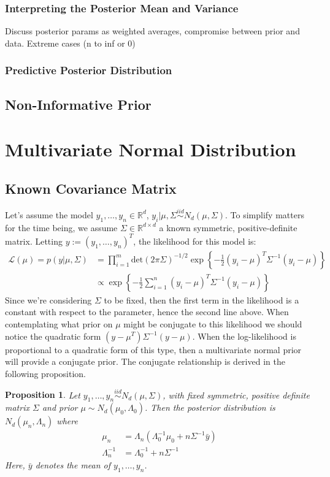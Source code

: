 \documentclass[12pt]{article}
\newcommand{\R}{\mathcal{R}}
\def\R{\mathbb{R}}
\newtheorem{prop}{Proposition}
\begin{document}
\subsubsection{Interpreting the Posterior Mean and Variance}
Discuss posterior params as weighted averages, compromise between prior and data. Extreme cases (n to inf or 0)

\subsubsection{Predictive Posterior Distribution}

\subsection{Non-Informative Prior}




\section{Multivariate Normal Distribution}
\subsection{Known Covariance Matrix} \label{mvn_mean}
Let's assume the model $y_1, \dots, y_n \in \R^d$, $y_i|\mu, \Sigma \overset{iid}{\sim} N_d(\mu, \Sigma)$. To simplify matters for the time being, we assume 
$\Sigma \in \R^{d \times d}$ a known symmetric, positive-definite matrix. Letting $y := (y_1, \dots, y_n)^T$, the likelihood for this model is: 
\begin{align*}
\mathcal{L}(\mu) = p(y|\mu, \Sigma) &= \prod_{i = 1}^{m} \text{det}(2\pi \Sigma)^{-1/2} \exp\left\{-\frac{1}{2}(y_i - \mu)^T \Sigma^{-1}(y_i - \mu)\right\} \\
			  			       &\propto \exp\left\{-\frac{1}{2} \sum_{i = 1}^{n} (y_i - \mu)^T \Sigma^{-1}(y_i - \mu)\right\}
\end{align*}
Since we're considering $\Sigma$ to be fixed, then the first term in the likelihood is a constant with respect to the parameter, hence the second line above. 
When contemplating what prior on $\mu$ might be conjugate to this likelihood we should notice the quadratic form $(y - \mu^T)\Sigma^{-1}(y - \mu)$. When the 
log-likelihood is proportional to a quadratic form of this type, then a multivariate normal prior will provide a conjugate prior. The conjugate relationship 
is derived in the following proposition. 
\begin{prop} \label{normal_mean_known_variance}
Let $y_1, \dots, y_n \overset{iid}{\sim} N_d(\mu, \Sigma)$, with fixed symmetric, positive definite matrix $\Sigma$ and prior $\mu \sim N_d(\mu_0, \Lambda_0)$.
Then the posterior distribution is $N_d(\mu_n, \Lambda_n)$
where 
\begin{align*}
\mu_n &= \Lambda_n (\Lambda_0^{-1} \mu_0 + n \Sigma^{-1} \bar{y}) \\
\Lambda_n^{-1} &= \Lambda_0^{-1} + n \Sigma^{-1}
\end{align*}
Here, $\bar{y}$ denotes the mean of $y_1, \dots, y_n$. 
\end{prop}
\end{document}

